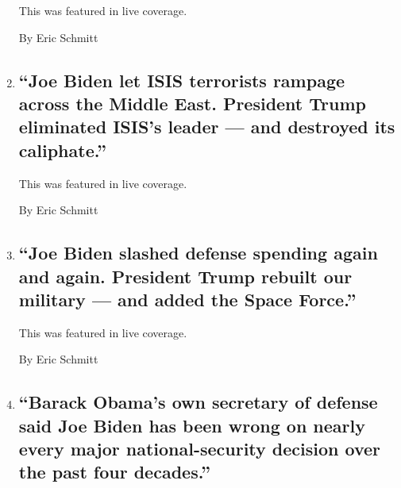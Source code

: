 \begin{enumerate}
  This was featured in live coverage.

  By Eric Schmitt
\item
  \href{/live/2020/08/27/us/rnc-fact-check/joe-biden-let-isis-terrorists-rampage-across-the-middle-east-president-trump-eliminated-isiss-leader-and-destroyed-its-caliphate}{}

  \hypertarget{joe-biden-let-isis-terrorists-rampage-across-the-middle-east-president-trump-eliminated-isiss-leader--and-destroyed-its-caliphate}{%
  \subsection{``Joe Biden let ISIS terrorists rampage across the Middle
  East. President Trump eliminated ISIS's leader --- and destroyed its
  caliphate.''}\label{joe-biden-let-isis-terrorists-rampage-across-the-middle-east-president-trump-eliminated-isiss-leader--and-destroyed-its-caliphate}}

  This was featured in live coverage.

  By Eric Schmitt
\item
  \href{/live/2020/08/27/us/rnc-fact-check/joe-biden-slashed-defense-spending-again-and-again-president-trump-rebuilt-our-military-and-added-the-space-force}{}

  \hypertarget{joe-biden-slashed-defense-spending-again-and-again-president-trump-rebuilt-our-military--and-added-the-space-force}{%
  \subsection{``Joe Biden slashed defense spending again and again.
  President Trump rebuilt our military --- and added the Space
  Force.''}\label{joe-biden-slashed-defense-spending-again-and-again-president-trump-rebuilt-our-military--and-added-the-space-force}}

  This was featured in live coverage.

  By Eric Schmitt
\item
  \href{/live/2020/08/27/us/rnc-fact-check/barack-obamas-own-secretary-of-defense-said-joe-biden-has-been-wrong-on-nearly-every-major-national-security-decision-over-the-p}{}

  \hypertarget{barack-obamas-own-secretary-of-defense-said-joe-biden-has-been-wrong-on-nearly-every-major-national-security-decision-over-the-past-four-decades}{%
  \subsection{``Barack Obama's own secretary of defense said Joe Biden
  has been wrong on nearly every major national-security decision over
  the past four
  decades.''}\label{barack-obamas-own-secretary-of-defense-said-joe-biden-has-been-wrong-on-nearly-every-major-national-security-decision-over-the-past-four-decades}}


\end{enumerate}
